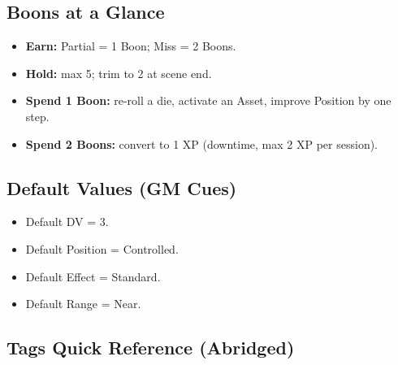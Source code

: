 \subsection{Boons at a Glance}

\begin{itemize}
  \item \textbf{Earn:} Partial = 1 Boon; Miss = 2 Boons.
  \item \textbf{Hold:} max 5; trim to 2 at scene end.
  \item \textbf{Spend 1 Boon:} re-roll a die, activate an Asset, improve Position by one step.
  \item \textbf{Spend 2 Boons:} convert to 1 XP (downtime, max 2 XP per session).
\end{itemize}

\subsection{Default Values (GM Cues)}

\begin{itemize}
  \item Default DV = 3.
  \item Default Position = Controlled.
  \item Default Effect = Standard.
  \item Default Range = Near.
\end{itemize}

\subsection{Tags Quick Reference (Abridged)}

